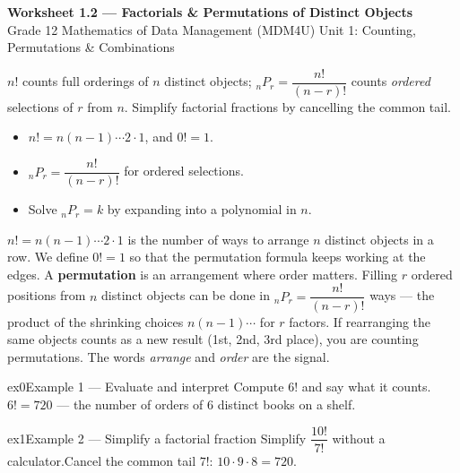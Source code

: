 \documentclass[11pt]{article}
\begin{document}
\begin{center}
{\LARGE\bfseries\color{titleblue}Worksheet 1.2 --- Factorials \& Permutations of Distinct Objects}\\[2pt]
{\small Grade 12 Mathematics of Data Management (MDM4U) \textperiodcentered{} Unit 1: Counting, Permutations \& Combinations}
\end{center}

\begin{ideabox}
$n!$ counts full orderings of $n$ distinct objects; $_nP_r=\dfrac{n!}{(n-r)!}$ counts \emph{ordered} selections of $r$ from $n$. Simplify factorial fractions by cancelling the common tail.
\begin{itemize}[leftmargin=*,itemsep=2pt]
  \item $n!=n(n-1)\cdots2\cdot1$, and $0!=1$.
  \item $_nP_r=\dfrac{n!}{(n-r)!}$ for ordered selections.
  \item Solve $_nP_r=k$ by expanding into a polynomial in $n$.
\end{itemize}
\end{ideabox}

\begin{learnbox}
$n! = n(n-1)\cdots2\cdot1$ is the number of ways to arrange $n$ distinct objects in a row. We define $0!=1$ so that the permutation formula keeps working at the edges.
A \textbf{permutation} is an arrangement where order matters. Filling $r$ ordered positions from $n$ distinct objects can be done in ${}_{n}P_{r}=\dfrac{n!}{(n-r)!}$ ways — the product of the shrinking choices $n(n-1)\cdots$ for $r$ factors.
If rearranging the same objects counts as a new result (1st, 2nd, 3rd place), you are counting permutations. The words \emph{arrange} and \emph{order} are the signal.
\end{learnbox}


\begin{example}{ex0}{Example 1 --- Evaluate and interpret}
Compute $6!$ and say what it counts.\soln $6!=720$ --- the number of orders of 6 distinct books on a shelf.
\end{example}

\begin{example}{ex1}{Example 2 --- Simplify a factorial fraction}
Simplify $\dfrac{10!}{7!}$ without a calculator.\soln Cancel the common tail $7!$: $10\cdot9\cdot8=720$.
\end{example}
\end{document}
